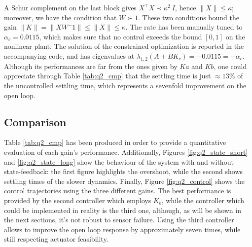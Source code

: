 \documentclass[10pt,a4paper]{scrartcl}
\begin{document}
A Schur complement on the last block gives $X^\top X \prec \kappa^2 \ I$, hence $\| X \| \le \kappa$; moreover, we have the condition that $W \succ 1$. These two conditions bound the gain $\| K \| = \|XW^-1\| \le \|X\| \le \kappa$. The rate has been manually tuned to $\alpha_c = 0.0115$, which makes sure that no control exceeds the bound $[0,1]$ on the nonlinear plant. The solution of the constrained optimization is reported in the accompanying code, and has eigenvalues at $\lambda_{1,2}(A+BK_c)=-0.0115=-\alpha_c$. Although its performances are far from the ones given by $Ka$ and $Kb$, one could appreciate through Table \ref{tab:q2_cmp} that the settling time is just $\approx 13\%$ of the uncontrolled settling time, which represents a sevenfold improvement on the open loop.

\subsection{Comparison}

Table \ref{tab:q2_cmp} has been produced in order to provide a quantitative evaluation of each gain's performance. 
Additionally, Figures \ref{fig:q2_state_short} and \ref{fig:q2_state_long} show the behaviour of the system with and without state-feedback: the first figure highlights the overshoot, while the second shows settling times of the slower dynamics. Finally, Figure \ref{fig:q2_control} shows the control trajectories using the three different gains. The best performance is provided by the second controller which employs $K_b$, while the controller which could be implemented in reality is the third one, although, as will be shown in the next sections, it's not robust to sensor failure. Using the third controller allows to improve the open loop response by approximately seven times, while still respecting actuator feasibility. 
\end{document}
